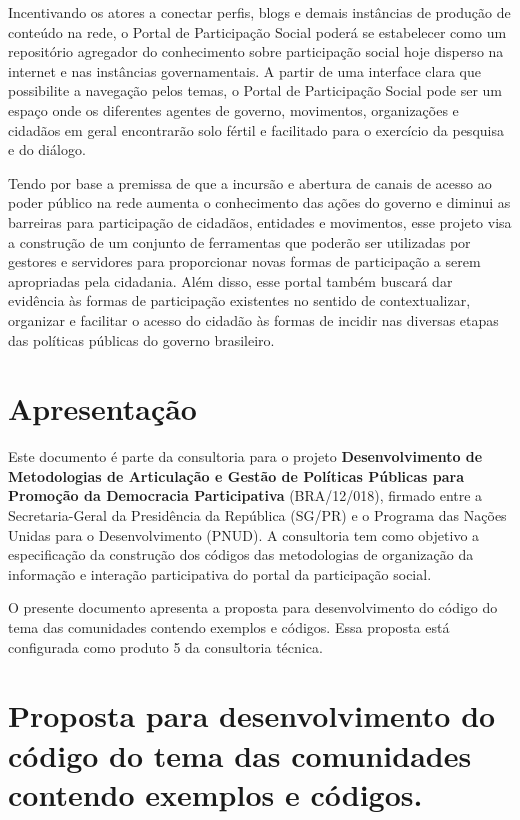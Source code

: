 \documentclass[[a4paper,11pt]{article}
\begin{document}
Incentivando os atores a conectar perfis, blogs e demais instâncias de
produção
de conteúdo na rede, o Portal de Participação Social poderá se
estabelecer como um
repositório agregador do conhecimento sobre participação social hoje
disperso na
internet e nas instâncias governamentais. A partir de uma interface
clara que possibilite
a navegação pelos temas, o Portal de Participação Social pode ser um
espaço onde os
diferentes agentes de governo, movimentos, organizações e cidadãos em
geral
encontrarão solo fértil e facilitado para o exercício da pesquisa e do
diálogo.

Tendo por base a premissa de que a incursão e abertura de canais de
acesso ao
poder público na rede aumenta o conhecimento das ações do governo e
diminui as
barreiras para participação de cidadãos, entidades e movimentos, esse
projeto visa a
construção de um conjunto de ferramentas que poderão ser utilizadas por
gestores e
servidores para proporcionar novas formas de participação a serem
apropriadas pela
cidadania. Além disso, esse portal também buscará dar evidência às
formas de
participação existentes no sentido de contextualizar, organizar e
facilitar o acesso do
cidadão às formas de incidir nas diversas etapas das políticas públicas
do governo
brasileiro.

\section{Apresentação}

Este documento é parte da consultoria para o projeto
\textbf{Desenvolvimento de Metodologias de Articulação e Gestão de
Políticas Públicas para Promoção da Democracia Participativa}
(BRA/12/018), firmado entre a Secretaria-Geral da Presidência da República
(SG/PR) e o Programa das Nações Unidas para o Desenvolvimento (PNUD).
A consultoria tem como objetivo a especificação da construção dos códigos das
metodologias de organização da informação e interação participativa do
portal da participação social.

O presente documento apresenta a proposta para
desenvolvimento do código do tema das comunidades contendo exemplos e códigos.
Essa proposta está configurada como produto 5 da consultoria técnica.

\section{Proposta para desenvolvimento do código do tema das 
comunidades contendo exemplos e códigos.}
\end{document}
